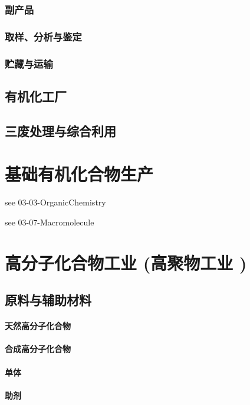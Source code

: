 \documentclass[UTF8]{../../ApplicationUniverse}
\begin{document}
    \subsection{副产品}
    \subsection{取样、分析与鉴定}
    \subsection{贮藏与运输}
\section{有机化工厂}
\section{三废处理与综合利用}





\chapter{基础有机化合物生产}%
see 03-03-OrganicChemistry

see 03-07-Macromolecule




\chapter{高分子化合物工业 (高聚物工业 )}
\section{原料与辅助材料}
    \subsubsection{天然高分子化合物}
        \subsubsection{合成高分子化合物}
            \subsubsection{单体}
            \subsubsection{助剂}
\end{document}
